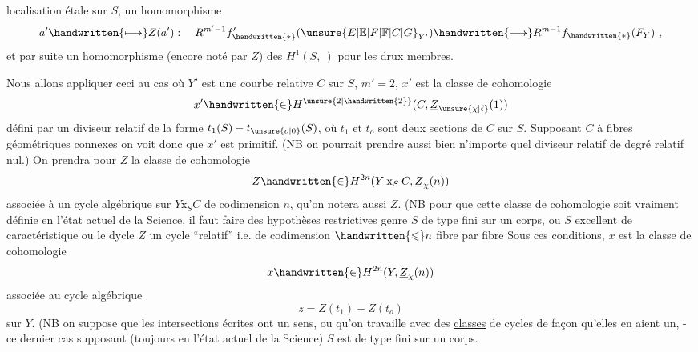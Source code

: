 localisation étale sur $S$, un homomorphisme
\[
a'\handwritten{\longmapsto}Z(a'):\quad R^{m'-1}f'_{\handwritten{*}}({\unsure{E|\mathbb{E}|F|\mathbb{F}|C|G}}_{Y'})\handwritten{\longrightarrow}R^{m-1}f_{\handwritten{*}}(F_Y)\ ,
\]
et par suite un homomorphisme (encore noté par $Z$) des $H^1(S,\ )$ pour les drux membres.

Nous allons appliquer ceci au cas où $Y'$ est une courbe relative $C$ sur $S$, $m'=2$, $x'$ est la classe de cohomologie
\[
x'\handwritten{\in}H^{\unsure{2|\handwritten{2}}}(C,\underline{Z}_{\unsure{\chi|\ell}}(1))
\]
défini par un diviseur relatif de la forme $t_1(S)-t_{\unsure{o|0}}(S)$, où $t_1$ et $t_o$ sont deux sections de $C$ sur $S$. Supposant $C$ à fibres géométriques connexes on voit donc que $x'$ est primitif. (NB on pourrait prendre aussi bien n'importe quel diviseur relatif de degré relatif nul.) On prendra pour $Z$ la classe de cohomologie
\[
Z\handwritten{\in}H^{2n}(Y\mathbin{\mathrm{x}}_S C,\underline{Z}_{\chi}(n))
\]
associée à un cycle algébrique sur $Y\mathbin{\mathrm{x}}_S C$ de codimension $n$, qu'on notera aussi $Z$. (NB pour que cette classe de cohomologie soit vraiment définie en l'état actuel de la Science, il faut faire des hypothèses restrictives genre $S$ de type fini sur un corps, ou $S$ excellent de caractéristique  ou le dycle $Z$ un cycle ``relatif'' i.e. de codimension $\handwritten{\leqslant}n$ fibre par fibre
Sous ces conditions, $x$ est la classe de cohomologie
\[
x\handwritten{\in}H^{2n}(Y,\underline{Z}_{\chi}(n))
\]
associée au cycle algébrique
\[
z=Z(t_1)-Z(t_o)
\]
sur $Y$. (NB on suppose que les intersections écrites ont un sens, ou qu'on travaille avec des \uline{classes} de cycles de façon qu'elles en aient un, - ce dernier cas supposant (toujours en l'état actuel de la Science)  $S$ est de type fini sur un corps.

